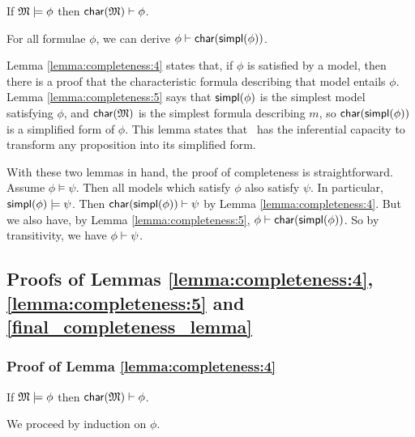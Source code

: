 

\begin{lemma}\label{lemma:completeness:4}
If $\frak{M} \models \phi$ then $\mathsf{char}(\frak{M}) \vdash \phi$.
\end{lemma}

\begin{lemma}\label{lemma:completeness:5}
For all formulae $\phi$, we can derive $\phi \vdash \mathsf{char}(\mathsf{simpl}(\phi))$.
\end{lemma}

\NI Lemma \ref{lemma:completeness:4} states that, if $\phi$ is
satisfied by a model, then there is a proof that the characteristic
formula describing that model entails $\phi$.  Lemma
\ref{lemma:completeness:5} says that $\mathsf{simpl}(\phi)$ is the simplest
model satisfying $\phi$, and $\mathsf{char}(\frak{M})$ is the simplest formula
describing $m$, so $\mathsf{char}(\mathsf{simpl}(\phi))$ is a simplified form of
$\phi$. This lemma states that \cathoristic\ has the inferential capacity to
transform any proposition into its simplified form.

With these two lemmas in hand, the proof of completeness is
straightforward.  Assume $\phi \models \psi$.  Then all models which satisfy
$\phi$ also satisfy $\psi$.  In particular, $\mathsf{simpl}(\phi) \models \psi$.  Then
$\mathsf{char}(\mathsf{simpl}(\phi)) \vdash \psi$ by Lemma \ref{lemma:completeness:4}.  But we
also have, by Lemma \ref{lemma:completeness:5}, $\phi \vdash
\mathsf{char}(\mathsf{simpl}(\phi)) $.  So by transitivity, we have $\phi \vdash \psi$.  

\subsection{Proofs of Lemmas \ref{lemma:completeness:4}, \ref{lemma:completeness:5} and \ref{final_completeness_lemma}}

\subsubsection{Proof of Lemma \ref{lemma:completeness:4}}
\label{prooflemma4}
If $\frak{M}\models \phi$ then $\mathsf{char}(\frak{M}) \vdash \phi$.

\NI We proceed by induction on $\phi$.

